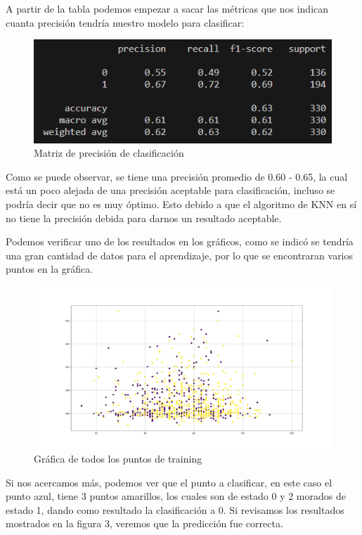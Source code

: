 \documentclass[12pt]{article} %
\begin{document}
A partir de la tabla podemos empezar a sacar las métricas que nos indican cuanta precisión tendría nuestro modelo para clasificar:

\begin{figure}[H]
\centering
\includegraphics[width=\textwidth]{metricas}
\caption{Matriz de precisión de clasificación}
\end{figure}

Como se puede observar, se tiene una precisión promedio de 0.60 - 0.65, la cual está un poco alejada de una precisión aceptable para clasificación, incluso se podría decir que no es muy óptimo.
Esto debido a que el algoritmo de KNN en sí no tiene la precisión debida para darnos un resultado aceptable.

Podemos verificar uno de los resultados en los gráficos, como se indicó se tendría una gran cantidad de datos para el aprendizaje, por lo que se encontraran varios puntos en la gráfica.

\begin{figure}[H]
\centering
\includegraphics[width=\textwidth]{grafica1}
\caption{Gráfica de todos los puntos de training}
\end{figure}

Si nos acercamos más, podemos ver que el punto a clasificar, en este caso el punto azul, tiene 3 puntos amarillos, los cuales son de estado 0 y 2 morados de estado 1,
dando como resultado la clasificación a 0. Si revisamos los resultados mostrados en la figura 3, veremos que la predicción fue correcta.
\end{document}
